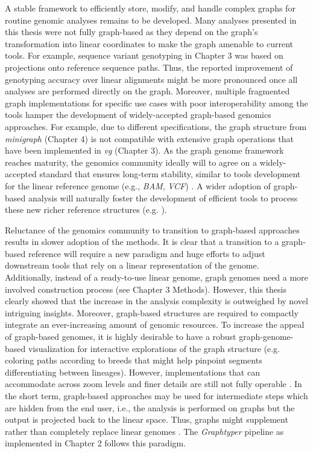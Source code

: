 \documentclass[../main.tex]{subfiles}
\begin{document}
A stable framework to efficiently store, modify, and handle complex graphs for routine genomic analyses remains to be developed. Many analyses presented in this thesis were not fully graph-based as they depend on the graph’s transformation into linear coordinates to make the graph amenable to current tools. For example, sequence variant genotyping in Chapter 3 was based on projections onto reference sequence paths. Thus, the reported improvement of genotyping accuracy over linear alignments might be more pronounced once all analyses are performed directly on the graph. Moreover, multiple fragmented graph implementations for specific use cases with poor interoperability among the tools hamper the development of widely-accepted graph-based genomics approaches. For example, due to different specifications, the graph structure from \emph{minigraph} (Chapter 4) is not compatible with extensive graph operations that have been implemented in \emph{vg} (Chapter 3). As the graph genome framework reaches maturity, the genomics community ideally will to agree on a widely-accepted standard that ensures long-term stability, similar to  tools development for the linear reference genome (e.g., \emph{BAM}, \emph{VCF}) \citep{bonfield2021htslib}. A wider adoption of graph-based analysis will naturally foster the development of efficient tools to process these new richer reference structures (e.g. \citep{qiu2021constructing,schulz2020detecting}).

Reluctance of the genomics community to transition to graph-based approaches results in slower adoption of the methods. It is clear that a transition to a graph-based reference will require a new paradigm and huge efforts to adjust downstream tools that rely on a linear representation of the genome. Additionally, instead of a ready-to-use linear genome, graph genomes need a more involved construction process (see Chapter 3 Methods). However, this thesis clearly showed that the increase in the analysis complexity is outweighed by novel intriguing insights. Moreover, graph-based structures are required to compactly integrate an ever-increasing amount of genomic resources. To increase the appeal of graph-based genomes, it is highly desirable to have a robust graph-genome-based visualization for interactive explorations of the graph structure (e.g. coloring paths according to breeds that might help pinpoint segments differentiating between lineages). However, implementations that can accommodate across zoom levels and finer details are still not fully operable \citep{yokoyama2019momi,beyer2019sequence,eizenga2020pangenome}. In the short term, graph-based approaches may be used for intermediate steps which are hidden from the end user, i.e., the analysis is performed on graphs but the output is projected back to the linear space. Thus, graphs might supplement rather than completely replace linear genomes \citep{kim2019graph,grytten2020assessing,li2020design,siren2020genotyping}. The \emph{Graphtyper} pipeline as implemented in Chapter 2 follows this paradigm. 
\end{document}
